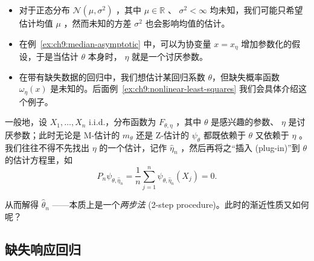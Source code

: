 \begin{itemize}
\tightlist
\item
  对于正态分布 $\mathcal N(\mu,\sigma^2)$ ，其中 $\mu\in\mathbb R$ 、 $\sigma^2<\infty$ 均未知，我们可能只希望估计均值 $\mu$ ，然而未知的方差 $\sigma^2$ 也会影响均值的估计。
\item
  在例~\ref{ex:ch9:median-asymptotic} 中，可以为协变量 $x=x_\eta$ 增加参数化的假设，于是当估计 $\theta$ 本身时， $\eta$ 就是一个讨厌参数。
\item
  在带有缺失数据的回归中，我们想估计某回归系数 $\theta$，但缺失概率函数 $\omega_\eta(x)$ 是未知的。后面例~\ref{ex:ch9:nonlinear-least-squares} 我们会具体介绍这个例子。
\end{itemize}

一般地，设 $X_1,\dots,X_n$ i.i.d.，分布函数为 $F_{\theta,\eta}$ ，其中 $\theta$ 是感兴趣的参数、 $\eta$ 是讨厌参数；此时无论是 M-估计的 $m_\theta$ 还是 Z-估计的 $\psi_\theta$ 都既依赖于 $\theta$ 又依赖于 $\eta$ 。我们往往不得不先找出 $\eta$ 的一个估计，记作 $\widehat\eta_n$ ，然后再将之``插入 (plug-in)''到 $\theta$ 的估计方程里，如
\[
P_n\psi_{\theta,\widehat\eta_n}=\frac1n\sum_{j=1}^n\psi_{\theta,\widehat\eta_n}(X_j)=0.
\]

从而解得 $\widehat\theta_n$ ------本质上是一个\emph{两步法} (2-step procedure)。此时的渐近性质又如何呢？

\subsection{缺失响应回归}

